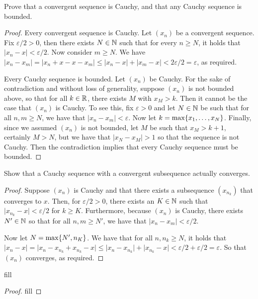 \begin{exercise}{14}
Prove that a convergent sequence is Cauchy, and that any Cauchy sequence is bounded.
\end{exercise}
\begin{proof}
Every convergent sequence is Cauchy. Let $(x_n)$ be a convergent sequence. Fix $\varepsilon/2>0$, then there exists $N\in\mathbb{N}$ such that for every $n\geq N$, it holds that $\lvert x_n-x\rvert<\varepsilon/2$. Now consider $m\geq N$. We have $\lvert x_n-x_m\rvert = \lvert x_n+x-x-x_m\lvert \leq \lvert x_n-x\rvert + \lvert x_m-x\rvert<2\varepsilon/2=\varepsilon$, as required.

Every Cauchy sequence is bounded. Let $(x_n)$ be Cauchy. For the sake of contradiction and without loss of generality, suppose $(x_n)$ is not bounded above, so that for all $k\in\mathbb{R}$, there exists $M$ with $x_M>k$. Then it cannot be the case that $(x_n)$ is Cauchy. To see this, fix $\varepsilon>0$ and let $N\in\mathbb{N}$ be such that for all $n,m\geq N$, we have that $\lvert x_n-x_m\rvert<\varepsilon$. Now let $k=\max\{x_1,\dots,x_N\}$. Finally, since we assumed $(x_n)$ is not bounded, let $M$ be such that $x_M>k+1$, certainly $M>N$, but we have that $\lvert x_N-x_M\rvert>1$ so that the sequence is not Cauchy. Then the contradiction implies that every Cauchy sequence must be bounded.
\end{proof}

\begin{exercise}{15}
Show that a Cauchy sequence with a convergent subsequence actually converges.
\end{exercise}
\begin{proof}
Suppose $(x_n)$ is Cauchy and that there exists a subsequence $(x_{n_{k}})$ that converges to $x$. Then, for $\varepsilon/2>0$, there exists an $K\in\mathbb{N}$ such that $\lvert x_{n_{k}}-x\rvert<\varepsilon/2$ for $k\geq K$. Furthermore, because $(x_n)$ is Cauchy, there exists $N'\in\mathbb{N}$ so that for all $n,m\geq N'$, we have that $\lvert x_n-x_m\rvert<\varepsilon/2$. 

Now let $N=\max\{N', n_K\}$. We have that for all $n,n_k\geq N$, it holds that $\lvert x_n-x\rvert= \lvert x_n-x_{n_k}+x_{n_k}-x\rvert\leq\lvert x_n-x_{n_k}\rvert+\lvert x_{n_k}-x\rvert <\varepsilon/2+\varepsilon/2=\varepsilon$. So that $(x_n)$ converges, as required.
\end{proof}

\begin{exercise}{17}
fill
\end{exercise}
\begin{proof}
fill
\end{proof}

